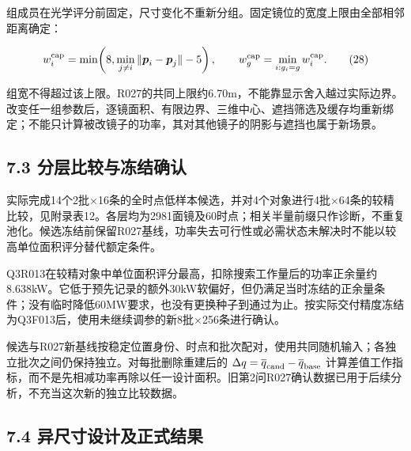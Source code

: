 \documentclass[UTF8,fontset=windows,zihao=-4]{ctexart}
\begin{document}
\par\noindent\begin{minipage}{\linewidth}
组成员在光学评分前固定，尺寸变化不重新分组。固定镜位的宽度上限由全部相邻距离确定：

\[
w_i^{\rm cap}=\min\!\left(8,\min_{j\ne i}\|\boldsymbol p_i-\boldsymbol p_j\|-5\right),
\qquad w_g^{\rm cap}=\min_{i:g_i=g}w_i^{\rm cap}.
\tag{28}
\]
\end{minipage}\par

组宽不得超过该上限。R027的共同上限约6.70m，不能靠显示舍入越过实际边界。改变任一组参数后，逐镜面积、有限边界、三维中心、遮挡筛选及缓存均重新绑定；不能只计算被改镜子的功率，其对其他镜子的阴影与遮挡也属于新场景。

\subsection*{7.3 分层比较与冻结确认}

实际完成14个2批\(\times\)16条的全时点低样本候选，并对4个对象进行4批\(\times\)64条的较精比较，见附录表12。各层均为2981面镜及60时点；相关半量前缀只作诊断，不重复池化。候选冻结前保留R027基线，功率失去可行性或必需状态未解决时不能以较高单位面积评分替代额定条件。

Q3R013在较精对象中单位面积评分最高，扣除搜索工作量后的功率正余量约8.638kW。它低于预先记录的额外30kW软偏好，但仍满足当时冻结的正余量条件；没有临时降低60MW要求，也没有更换种子到通过为止。按实际交付精度冻结为Q3F013后，使用未继续调参的新8批\(\times\)256条进行确认。

候选与R027新基线按稳定位置身份、时点和批次配对，使用共同随机输入；各独立批次之间仍保持独立。对每批删除重建后的 \(\Delta q=\overline q_{\rm cand}-\overline q_{\rm base}\) 计算差值工作指标，而不是先相减功率再除以任一设计面积。旧第2问R027确认数据已用于后续分析，不充当这次新的独立比较数据。

\subsection*{7.4 异尺寸设计及正式结果}
\end{document}
